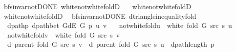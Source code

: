 \begin{isabellebody}
\endisatagproof
{\isafoldproof}%
%
\isadelimproof
\isanewline
%
\endisadelimproof
%
\isadeliminvisible
\isanewline
%
\endisadeliminvisible
%
\isataginvisible
{}\isamarkupfalse%
\ {\isacharparenleft}{\kern0pt}\ bfs{\isacharunderscore}{\kern0pt}invar{\isacharunderscore}{\kern0pt}not{\isacharunderscore}{\kern0pt}DONE{\isacharparenright}{\kern0pt}\ white{\isacharunderscore}{\kern0pt}not{\isacharunderscore}{\kern0pt}white{\isacharunderscore}{\kern0pt}foldD\ {\isacharequal}{\kern0pt}\isanewline
\ \ white{\isacharunderscore}{\kern0pt}not{\isacharunderscore}{\kern0pt}white{\isacharunderscore}{\kern0pt}foldD\isanewline
\ \ white{\isacharunderscore}{\kern0pt}not{\isacharunderscore}{\kern0pt}white{\isacharunderscore}{\kern0pt}foldD{\isacharunderscore}{\kern0pt}{}%
\endisataginvisible
{\isafoldinvisible}%
%
\isadeliminvisible
\isanewline
%
\endisadeliminvisible
\isanewline
{}\isamarkupfalse%
\ {\isacharparenleft}{\kern0pt}\ bfs{\isacharunderscore}{\kern0pt}invar{\isacharunderscore}{\kern0pt}not{\isacharunderscore}{\kern0pt}DONE{\isacharparenright}{\kern0pt}\ d{\isacharunderscore}{\kern0pt}triangle{\isacharunderscore}{\kern0pt}inequality{\isacharunderscore}{\kern0pt}fold{\isacharcolon}{\kern0pt}\isanewline
\ \ \ dpath{\isacharunderscore}{\kern0pt}p{\isacharcolon}{\kern0pt}\ {\isachardoublequoteopen}dpath{\isacharunderscore}{\kern0pt}bet\ {\isacharparenleft}{\kern0pt}G{\isachardot}{\kern0pt}dE\ G{\isacharparenright}{\kern0pt}\ p\ u\ v{\isachardoublequoteclose}\isanewline
\ \ \ not{\isacharunderscore}{\kern0pt}white{\isacharunderscore}{\kern0pt}fold{\isacharunderscore}{\kern0pt}u{\isacharcolon}{\kern0pt}\ {\isachardoublequoteopen}{\isasymnot}\ white\ {\isacharparenleft}{\kern0pt}fold\ G\ src\ s{\isacharparenright}{\kern0pt}\ u{\isachardoublequoteclose}\isanewline
\ \ \ not{\isacharunderscore}{\kern0pt}white{\isacharunderscore}{\kern0pt}fold{\isacharunderscore}{\kern0pt}v{\isacharcolon}{\kern0pt}\ {\isachardoublequoteopen}{\isasymnot}\ white\ {\isacharparenleft}{\kern0pt}fold\ G\ src\ s{\isacharparenright}{\kern0pt}\ v{\isachardoublequoteclose}\isanewline
\ \ \ {\isachardoublequoteopen}d\ {\isacharparenleft}{\kern0pt}parent\ {\isacharparenleft}{\kern0pt}fold\ G\ src\ s{\isacharparenright}{\kern0pt}{\isacharparenright}{\kern0pt}\ v\ {\isasymle}\ d\ {\isacharparenleft}{\kern0pt}parent\ {\isacharparenleft}{\kern0pt}fold\ G\ src\ s{\isacharparenright}{\kern0pt}{\isacharparenright}{\kern0pt}\ u\ {\isacharplus}{\kern0pt}\ dpath{\isacharunderscore}{\kern0pt}length\ p{\isachardoublequoteclose}\isanewline

\end{isabellebody}
